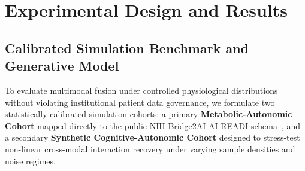 \documentclass[a4paper,fleqn]{cas-dc}
\begin{document}
\section{Experimental Design and Results}
\label{sec:experiments}

\subsection{Calibrated Simulation Benchmark and Generative Model}
\label{sec:cohort_setup}
To evaluate multimodal fusion under controlled physiological distributions without violating institutional patient data governance, we formulate two statistically calibrated simulation cohorts: a primary \textbf{Metabolic-Autonomic Cohort} mapped directly to the public NIH Bridge2AI AI-READI schema~\cite{aireadi2024}, and a secondary \textbf{Synthetic Cognitive-Autonomic Cohort} designed to stress-test non-linear cross-modal interaction recovery under varying sample densities and noise regimes.
\end{document}
